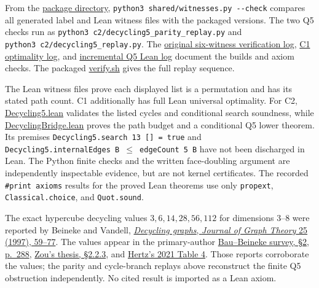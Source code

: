 \documentclass[11pt,a4paper]{article}
\begin{document}
From the \href{https://github.com/mpelteshki/climbing-to-the-frontier/tree/0680fde5d583d78c8a871bcf2bfae1028e16f117/cagent/p2}{package directory}, \texttt{python3\ shared/witnesses.py\ -\/-check} compares all generated label and Lean witness files with the packaged versions. The two Q5 checks run as \texttt{python3\ c2/decycling5\_parity\_replay.py} and \texttt{python3\ c2/decycling5\_replay.py}. The \href{https://github.com/mpelteshki/climbing-to-the-frontier/blob/0680fde5d583d78c8a871bcf2bfae1028e16f117/cagent/p2/verification.log}{original six-witness verification log}, \href{https://github.com/mpelteshki/climbing-to-the-frontier/blob/0680fde5d583d78c8a871bcf2bfae1028e16f117/cagent/p2/c1-optimality.log}{C1 optimality log}, and \href{https://github.com/mpelteshki/climbing-to-the-frontier/blob/0680fde5d583d78c8a871bcf2bfae1028e16f117/cagent/p2/decycling-increment-verification.log}{incremental Q5 Lean log} document the builds and axiom checks. The packaged \href{https://github.com/mpelteshki/climbing-to-the-frontier/blob/0680fde5d583d78c8a871bcf2bfae1028e16f117/cagent/p2/verify.sh}{verify.sh} gives the full replay sequence.

The Lean witness files prove each displayed list is a permutation and has its stated path count. C1 additionally has full Lean universal optimality. For C2, \href{https://github.com/mpelteshki/climbing-to-the-frontier/blob/0680fde5d583d78c8a871bcf2bfae1028e16f117/cagent/p2/shared/Decycling5.lean}{Decycling5.lean} validates the listed cycles and conditional search soundness, while \href{https://github.com/mpelteshki/climbing-to-the-frontier/blob/0680fde5d583d78c8a871bcf2bfae1028e16f117/cagent/p2/shared/DecyclingBridge.lean}{DecyclingBridge.lean} proves the path budget and a conditional Q5 lower theorem. Its premises \texttt{Decycling5.search\ 13\ {[}{]}\ =\ true} and \texttt{Decycling5.internalEdges\ B\ \ensuremath{\leq}\ edgeCount\ 5\ B} have not been discharged in Lean. The Python finite checks and the written face-doubling argument are independently inspectable evidence, but are not kernel certificates. The recorded \texttt{\#print\ axioms} results for the proved Lean theorems use only \texttt{propext}, \texttt{Classical.choice}, and \texttt{Quot.sound}.

The exact hypercube decycling values \(3,6,14,28,56,112\) for dimensions 3--8 were reported by Beineke and Vandell, \href{https://onlinelibrary.wiley.com/doi/10.1002/(SICI)1097-0118(199705)25:1\%3C59::AID-JGT4\%3E3.0.CO;2-H}{\emph{Decycling graphs}, \emph{Journal of Graph Theory} 25 (1997), 59--77}. The values appear in the primary-author \href{https://ajc.maths.uq.edu.au/pdf/25/ajc-v25-p285.pdf\#page=4}{Bau--Beineke survey, \S{}2, p.~288}, \href{https://www.math.mun.ca/~dapike/publications/Theses/YuboZou_PhD.pdf\#page=28}{Zou's thesis, \S{}2.2.3}, and \href{https://jgaa-v5.cs.brown.edu/index.php/jgaa/article/download/paper567/2402/2209\#page=17}{Hertz's 2021 Table 4}. Those reports corroborate the values; the parity and cycle-branch replays above reconstruct the finite Q5 obstruction independently. No cited result is imported as a Lean axiom.
\end{document}
